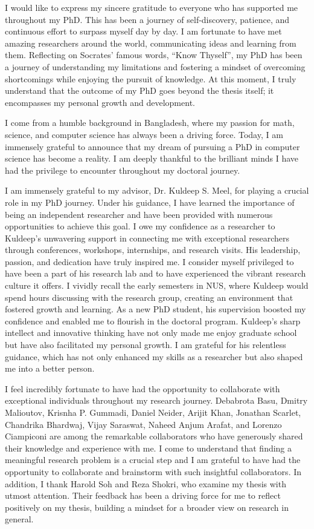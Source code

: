 \begin{acknowledgments}
	
I would like to express my sincere gratitude to everyone who has supported me throughout my PhD. This has been a journey of self-discovery, patience, and continuous effort to surpass myself day by day. I am fortunate to have met amazing researchers around the world, communicating ideas and learning from them. Reflecting on Socrates' famous words, ``Know Thyself'', my PhD has been a journey of understanding my limitations and fostering a mindset of overcoming shortcomings while enjoying the pursuit of knowledge. At this moment, I truly understand that the outcome of my PhD goes beyond the thesis itself; it encompasses my personal growth and development.


I come from a humble background in Bangladesh, where my passion for math, science, and computer science has always been a driving force. Today, I am immensely grateful to announce that my dream of pursuing a PhD in computer science has become a reality. I am deeply thankful to the brilliant minds I have had the privilege to encounter throughout my doctoral journey.

I am immensely grateful to my advisor, Dr. Kuldeep S. Meel, for playing a crucial role in my PhD journey. Under his guidance, I have learned the importance of being an independent researcher and have been provided with numerous opportunities to achieve this goal. I owe my confidence as a researcher to Kuldeep's unwavering support in connecting me with exceptional researchers through conferences, workshops, internships, and research visits. His leadership, passion, and dedication have truly inspired me. I consider myself privileged to have been a part of his research lab and to have experienced the vibrant research culture it offers. I vividly recall the early semesters in NUS, where Kuldeep would spend hours discussing with the research group, creating an environment that fostered growth and learning. As a new PhD student, his supervision boosted my confidence and enabled me to flourish in the doctoral program. Kuldeep's sharp intellect and innovative thinking have not only made me enjoy graduate school but have also facilitated my personal growth. I am grateful for his relentless guidance, which has not only enhanced my skills as a researcher but also shaped me into a better person.


I feel incredibly fortunate to have had the opportunity to collaborate with exceptional individuals throughout my research journey. Debabrota Basu, Dmitry Malioutov, Krisnha P. Gummadi, Daniel Neider, Arijit Khan, Jonathan Scarlet, Chandrika Bhardwaj, Vijay Saraswat, Naheed Anjum Arafat, and Lorenzo Ciampiconi are among the remarkable collaborators who have generously shared their knowledge and experience with me. I come to understand that finding a meaningful research problem is a crucial step and I am grateful to have had the opportunity to collaborate and brainstorm with such insightful collaborators. In addition, I thank Harold Soh and Reza Shokri, who examine my thesis with utmost attention. Their feedback has been a driving force for me to reflect positively on my thesis, building a mindset for a broader view on research in general.


\end{acknowledgments}
